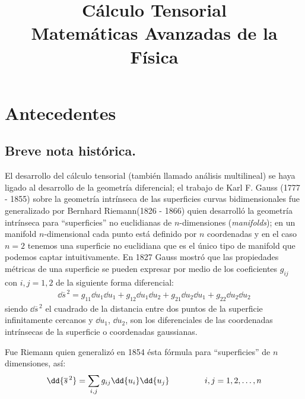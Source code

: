  
\author{}
\title{Cálculo Tensorial\\ {\large Matemáticas Avanzadas de la Física}\vspace{-1.5\baselineskip}}
\date{ }

\maketitle
\fontsize{14}{14}\selectfont

\chapter{Antecedentes}

\section{Breve nota histórica.}
El desarrollo del cálculo tensorial (también llamado análisis multilineal) se haya ligado al desarrollo de la geometría diferencial; el trabajo de Karl F. Gauss (1777 - 1855) sobre la geometría intrínseca de las superficies curvas bidimensionales fue generalizado por Bernhard Riemann(1826 - 1866) quien desarrolló la geometría intrínseca para \enquote{superficies} no euclidianas de $n$-dimensiones (\emph{manifolds}); en un manifold $n$-dimensional cada punto está definido por $n$ coordenadas y en el caso $n = 2$ tenemos una superficie no euclidiana que es el único tipo de manifold que podemos captar intuitivamente. En 1827 Gauss mostró que las propiedades métricas de una superficie se pueden expresar por medio de los coeficientes $g_{ij}$ con $i, j =1, 2$ de la siguiente forma diferencial:
\begin{align*}
\dd{\overline{s}^{\, 2}} = g_{11} \dd{u_{1}} \dd{u_{1}} + g_{12} \dd{u_{1}} \dd{u_{2}} + g_{21} \dd{u_{2}} \dd{u_{1}} + g_{22} \dd{u_{2}} \dd{u_{2}}
\end{align*}
siendo $\dd{\overline{s}^{\, 2}}$ el cuadrado de la distancia entre dos puntos de la superficie infinitamente cercanos y $\dd{u_{1}}$, $\dd{u_{2}}$, son los diferenciales de las coordenadas intrínsecas de la superficie o coordenadas gaussianas.
\par
Fue Riemann quien generalizó en 1854 ésta fórmula para \enquote{superficies} de $n$ dimensiones, así:
\begin{align*}
\dd{\overline{s}^{\, 2}} = \sum_{i, j} g_{ij} \dd{u_{i}} \dd{u_{j}} \hspace{1.5cm} i, j = 1, 2, \ldots, n
\end{align*}
